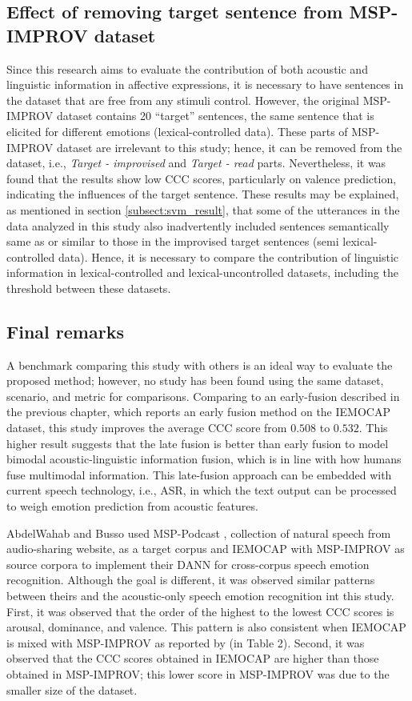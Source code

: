 \subsection{Effect of removing target sentence from MSP-IMPROV dataset}
Since this research aims to evaluate the contribution of both acoustic and
linguistic information in affective expressions, it is necessary to have
sentences in the dataset that are free from any stimuli control. However, the
original MSP-IMPROV dataset contains 20 ``target'' sentences, the same sentence
that is elicited for different emotions (lexical-controlled data). These parts
of MSP-IMPROV dataset are irrelevant to this study; hence, it can be removed
from the dataset, i.e., \textit{Target - improvised} and \textit{Target - read}
parts. Nevertheless, it was found that the results show low CCC scores,
particularly on valence prediction, indicating the influences of the target
sentence. These results may be explained, as mentioned in section
\ref{subsect:svm_result}, that some of the utterances in the data analyzed in
this study also inadvertently included sentences semantically same as or
similar to those in the improvised target sentences (semi lexical-controlled
data). Hence, it is necessary to compare the contribution of linguistic
information in lexical-controlled and lexical-uncontrolled datasets, including
the threshold between these datasets.

\subsection{Final remarks}
A benchmark comparing this study with others is an ideal way to evaluate the
proposed method; however, no study has been found using the same dataset,
scenario, and metric for comparisons. Comparing to an early-fusion described in
the previous chapter, which reports an early fusion method on the IEMOCAP
dataset, this study improves the average CCC score from $0.508$ to $0.532$.
This higher result suggests that the late fusion is better than early fusion to
model bimodal acoustic-linguistic information fusion, which is in line with how
humans fuse multimodal information. This late-fusion approach can be embedded
with current speech technology, i.e., ASR, in which the text output can be
processed to weigh emotion prediction from acoustic features.

AbdelWahab and Busso \cite{Abdelwahab2018} used MSP-Podcast \cite{Lotfian2019},
collection of natural speech from audio-sharing website, as a target corpus
and IEMOCAP with MSP-IMPROV as source corpora to implement their DANN for
cross-corpus speech emotion recognition.  Although the goal is different, it
was observed similar patterns between theirs and the acoustic-only speech
emotion recognition int this study.  First, it was observed that the order of
the highest to the lowest CCC scores is arousal, dominance, and valence. This
pattern is also consistent when IEMOCAP is mixed with MSP-IMPROV as reported by
\cite{parthasarathy2017jointly} (in Table 2).  Second, it was observed that the
CCC scores obtained in IEMOCAP are higher than those obtained in MSP-IMPROV;
this lower score in MSP-IMPROV was due to the smaller size of the dataset. 


